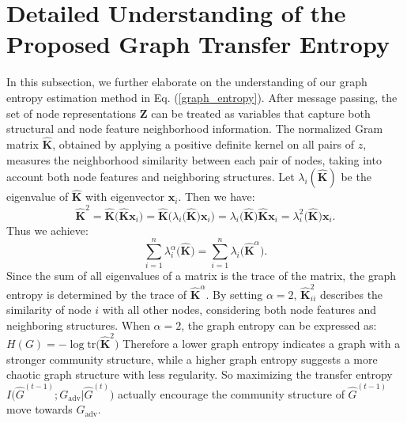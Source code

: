 \section{Detailed Understanding of the Proposed Graph Transfer Entropy}\label{appendix:understanding_entropy} 
In this subsection, we further elaborate on the understanding of our graph entropy estimation method in Eq. (\ref{graph_entropy}). 
After message passing, the set of node representations $\mathbf{Z}$ can be treated as variables that capture both structural and node feature neighborhood information. The normalized Gram matrix $\hat{\mathbf{K}}$, obtained by applying a positive definite kernel on all pairs of $z$, measures the neighborhood similarity between each pair of nodes, taking into account both node features and neighboring structures.
Let $\lambda_{i}(\hat{\mathbf{K}})$ be the eigenvalue of $\hat{\mathbf{K}}$ with eigenvector $\mathbf{x}_{i}$. Then we have:
\begin{equation}
    \hat{\mathbf{K}}^{2} = \hat{\mathbf{K}}\big(\hat{\mathbf{K}}\mathbf{x}_{i}\big) = \hat{\mathbf{K}}\big(\lambda_{i}\big(\hat{\mathbf{K}}\big)\mathbf{x}_{i}\big) = \lambda_{i}\big(\hat{\mathbf{K}}\big)\hat{\mathbf{K}}\mathbf{x}_{i} = \lambda_{i}^{2}\big(\hat{\mathbf{K}}\big)\mathbf{x}_{i}.
\end{equation}
Thus we achieve:
\begin{equation}
\sum_{i=1}^{n} \lambda_{i}^{\alpha}\big(\hat{\mathbf{K}}\big) = \sum_{i=1}^{n} \lambda_{i}\big(\hat{\mathbf{K}}^{\alpha}\big).
\end{equation}
Since the sum of all eigenvalues of a matrix is the trace of the matrix, the graph entropy is determined by the trace of $\hat{\mathbf{K}}^{\alpha}$. By setting $\alpha = 2$, $\hat{\mathbf{K}}_{ii}^{2}$ describes the similarity of node $i$ with all other nodes, considering both node features and neighboring structures. When $\alpha = 2$, the graph entropy can be expressed as:
$H(G) = -\log \text{tr}\big(\hat{\mathbf{K}}^{2}\big)$
Therefore a lower graph entropy indicates a graph with a stronger community structure, while a higher graph entropy suggests a more chaotic graph structure with less regularity.
So maximizing the transfer entropy $I\big(\hat{G}^{(t-1)}; G_{\text{adv}} | \hat{G}^{(t)}\big)$ actually encourage the community structure of $\hat{G}^{(t-1)}$ move towards $G_{\text{adv}}$.




